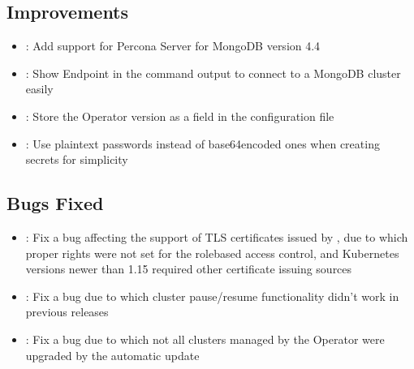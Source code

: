 \documentclass[letterpaper,10pt,english]{sphinxmanual}
\begin{document}
\subsection{Improvements}
\label{\detokenize{RN/Kubernetes-Operator-for-PSMONGODB-RN1.6.0:improvements}}\begin{itemize}
\item {} 
: Add support for Percona Server for MongoDB version 4.4

\item {} 
: Show Endpoint in the  command output to connect to a MongoDB cluster easily

\item {} 
: Store the Operator version as a  field in the  configuration file

\item {} 
: Use plain\sphinxhyphen{}text passwords instead of base64\sphinxhyphen{}encoded ones when creating {\hyperref[\detokenize{users:users-system-users}]{}} secrets for simplicity

\end{itemize}


\subsection{Bugs Fixed}
\label{\detokenize{RN/Kubernetes-Operator-for-PSMONGODB-RN1.6.0:bugs-fixed}}\begin{itemize}
\item {} 
: Fix a bug affecting the support of TLS certificates issued by ,
due to which proper rights were not set for the role\sphinxhyphen{}based access control, and
Kubernetes versions newer than 1.15 required other certificate issuing sources

\item {} 
: Fix a bug due to which cluster pause/resume functionality didn’t work in previous releases

\item {} 
: Fix a bug due to which not all clusters managed by the Operator were upgraded by the automatic update

\end{itemize}
\end{document}
